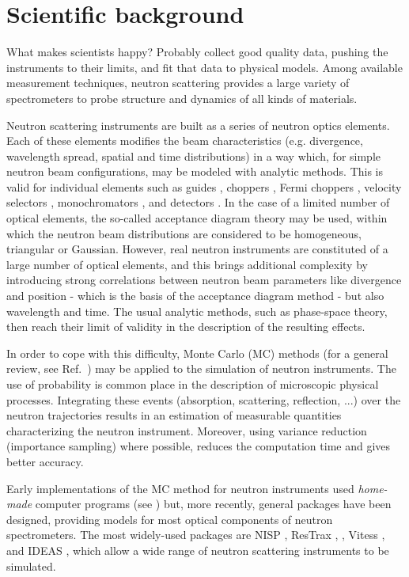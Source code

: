\section{Scientific background}
What makes scientists happy? Probably collect good quality data, pushing the instruments to their limits, and fit that data to physical models.
Among available measurement techniques, neutron scattering provides a
large variety of spectrometers to probe structure and dynamics of all
kinds of materials.

Neutron scattering instruments are built as a series of neutron optics elements. Each of these elements modifies the beam characteristics (e.g. divergence, wavelength spread, spatial and time distributions) in a way which, for simple neutron beam configurations, may be modeled with analytic methods. This is valid for individual elements such as guides \cite{Leibnitz63,Mildner90}, choppers \cite{Lowde60,Copley03}, Fermi choppers \cite{Fermi47,Peters05}, velocity selectors \cite{Clark66}, monochromators \cite{Freund83,Sears97,Shirane02,Alianelli04}, and detectors \cite{Radeka74,Charpak89,Manzin04}. In the case of a limited number of optical elements, the so-called acceptance diagram theory \cite{Mildner90,Copley93,Cussen03} may be used, within which the neutron beam distributions are considered to be homogeneous, triangular or Gaussian.
However, real neutron instruments are constituted of a large number of optical elements, and this brings additional complexity by introducing strong correlations between neutron beam parameters like divergence and position - which is the basis of the acceptance diagram method - but also wavelength and time. The usual analytic methods, such as phase-space theory, then reach their limit of validity in the description of the resulting effects.

In order to cope with this difficulty, Monte Carlo (MC) methods (for a general review, see Ref.~\cite{James80}) may be applied to the simulation of neutron instruments.
The use of probability is common place in the description of microscopic physical processes. Integrating these events (absorption, scattering, reflection, ...) over the neutron trajectories
results in an estimation of measurable quantities characterizing the neutron instrument. Moreover, using variance reduction (importance sampling)
where possible, reduces the computation time and gives better accuracy.

Early implementations of the MC method for neutron instruments used \emph{home-made} computer programs  (see \cite{Copley86,Mildner77}) but, more recently, general packages have been designed, providing models for most optical components of neutron spectrometers.
The most widely-used packages are NISP \cite{NISP}, ResTrax \cite{Restrax}, \MCS \cite{mcs_ppf,nn_10_20,mcstas_webpage}, Vitess \cite{Vitess}, and IDEAS \cite{IDEAS}, which allow a wide range of neutron scattering instruments to be simulated.

